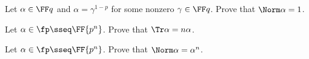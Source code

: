 \documentclass{article}
\begin{document}
\begin{subexercise}
Let \( \alpha\in\FF q \) and \( \alpha=\gamma^{1-p} \) for some nonzero \( \gamma\in\FF q \).
Prove that \( \Norm \alpha = 1 \).
\end{subexercise}
\begin{solution}

\end{solution}
\pagebreak

\begin{subexercise}
  Let \( \alpha\in\fp \sseq \FF{p^n} \).
  Prove that \( \Tr \alpha = n\alpha \).
\end{subexercise}
\begin{solution}

\end{solution}
\pagebreak

\begin{subexercise}
  Let \( \alpha\in\fp \sseq \FF{p^n} \).
  Prove that \( \Norm \alpha = \alpha^n \).
\end{subexercise}
\begin{solution}

\end{solution}
\end{document}
